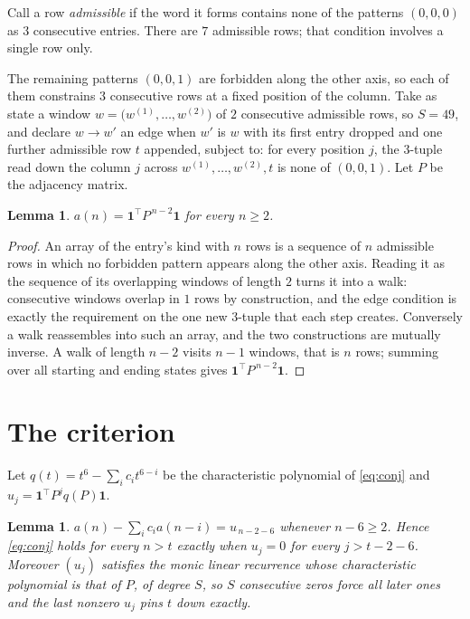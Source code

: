 \documentclass[11pt,a4paper]{article}
\theoremstyle{plain}
\newtheorem{lemma}[theorem]{Lemma}
\theoremstyle{definition}
\begin{document}
Call a row \emph{admissible} if the word it forms contains none of the patterns
$(0,0,0)$ as $3$ consecutive entries. There are $7$ admissible rows; that condition
involves a single row only.

The remaining patterns $(0,0,1)$ are forbidden along the other axis, so each of them
constrains $3$ consecutive rows at a fixed position of the column. Take as state a
window $w=\bigl(w^{(1)},\dots,w^{(2)}\bigr)$ of $2$ consecutive admissible
rows, so $S=49$, and declare $w\to w'$ an edge when $w'$ is $w$ with its first entry
dropped and one further admissible row $t$ appended, subject to: for every position
$j$, the $3$-tuple read down the column $j$ across $w^{(1)},\dots,w^{(2)},t$
is none of $(0,0,1)$. Let $P$ be the adjacency matrix.

\begin{lemma}\label{lem:walk}
$a(n)=\mathbf{1}^{\!\top}P^{\,n-2}\mathbf{1}$ for every $n\ge2$.
\end{lemma}

\begin{proof}
An array of the entry's kind with $n$ rows is a sequence of $n$ admissible rows in
which no forbidden pattern appears along the other axis. Reading it as the sequence of its
overlapping windows of length $2$ turns it into a walk: consecutive windows overlap in
$1$ rows by construction, and the edge condition is exactly the requirement on the one
new $3$-tuple that each step creates. Conversely a walk reassembles into such an array,
and the two constructions are mutually inverse. A walk of length $n-2$ visits $n-1$
windows, that is $n$ rows; summing over all starting and ending states gives
$\mathbf{1}^{\!\top}P^{\,n-2}\mathbf{1}$.
\end{proof}

\section{The criterion}

Let $q(t)=t^{6}-\sum_i c_i t^{6-i}$ be the characteristic polynomial of
\eqref{eq:conj} and $u_j=\mathbf{1}^{\!\top}P^{j}q(P)\mathbf{1}$.

\begin{lemma}\label{lem:crit}
$a(n)-\sum_i c_i a(n-i)=u_{\,n-2-6}$ whenever $n-6\ge2$. Hence
\eqref{eq:conj} holds for every $n>t$ exactly when $u_j=0$ for every
$j>t-2-6$. Moreover $(u_j)$ satisfies the monic linear recurrence whose
characteristic polynomial is that of $P$, of degree $S$, so $S$ consecutive zeros force all
later ones and the last nonzero $u_j$ pins $t$ down exactly.
\end{lemma}
\end{document}
